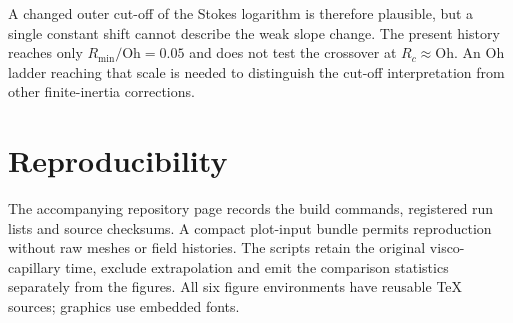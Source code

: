 \documentclass[10pt,a4paper]{article}
\newcommand{\Oh}{\mathrm{Oh}}
\newcommand{\Rmin}{R_{\min}}
\begin{document}
A changed outer cut-off of the Stokes logarithm is therefore plausible,
but a single constant shift cannot describe the weak slope change.
The present history reaches only $\Rmin/\Oh=0.05$ and does not test the
crossover at $R_c\approx\Oh$. An Oh ladder reaching that scale is needed
to distinguish the cut-off interpretation from other finite-inertia
corrections.

\section{Reproducibility}
The accompanying repository page records the build commands, registered
run lists and source checksums. A compact plot-input bundle permits
reproduction without raw meshes or field histories. The scripts retain
the original visco-capillary time, exclude extrapolation and emit the
comparison statistics separately from the figures. All six figure
environments have reusable TeX sources; graphics use embedded fonts.



\end{document}
